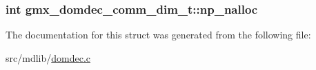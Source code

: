 \hypertarget{structgmx__domdec__comm__dim__t_a337ea5d8a7aa946b3b4f3cb75e6b53ec}{
\subsubsection[{np\-\_\-nalloc}]{\setlength{\rightskip}{0pt plus 5cm}int {\bf gmx\-\_\-domdec\-\_\-comm\-\_\-dim\-\_\-t\-::np\-\_\-nalloc}}}\label{structgmx__domdec__comm__dim__t_a337ea5d8a7aa946b3b4f3cb75e6b53ec}


\-The documentation for this struct was generated from the following file\-:\begin{DoxyCompactItemize}
\item 
src/mdlib/\hyperlink{domdec_8c}{domdec.\-c}\end{DoxyCompactItemize}
